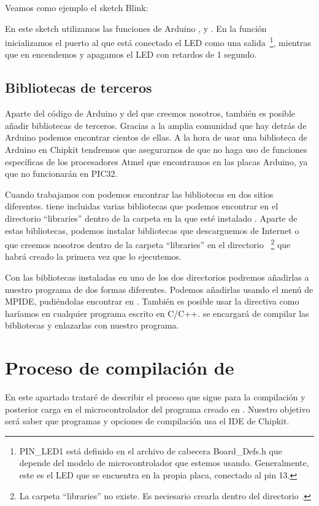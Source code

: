 Veamos como ejemplo el sketch Blink:


En este sketch utilizamos las funciones de Arduino , y . En la función  inicializamos el puerto al que está conectado el LED como una salida~\protect\footnote{PIN\_LED1 está definido en el archivo de cabecera Board\_Defs.h que depende del modelo de microcontrolador que estemos usando. Generalmente, este es el LED que se encuentra en la propia placa, conectado al pin 13.}, mientras que en  encendemos y apagamos el LED con retardos de 1 segundo.

\subsection{Bibliotecas de terceros}
Aparte del código de Arduino y del que creemos nosotros, también es posible añadir bibliotecas de terceros. Gracias a la amplia comunidad que hay detrás de Arduino podemos encontrar cientos de ellas. A la hora de usar una biblioteca de Arduino en Chipkit tendremos que asegurarnos de que no haga uso de funciones específicas de los procesadores Atmel que encontramos en las placas Arduino, ya que no funcionarán en PIC32.

Cuando trabajamos con  podemos encontrar las bibliotecas en dos sitios diferentes.  tiene incluidas varias bibliotecas que podemos encontrar en el directorio ``libraries'' dentro de la carpeta en la que esté instalado . Aparte de estas bibliotecas, podemos instalar bibliotecas que descarguemos de Internet o que creemos nosotros dentro de la carpeta ``libraries'' en el directorio ~\protect\footnote{La carpeta ``libraries'' no existe. Es neciesario crearla dentro del directorio .} que  habrá creado la primera vez que lo ejecutemos.

Con las bibliotecas instaladas en uno de los dos directorios podremos añadirlas a nuestro programa de dos formas diferentes. Podemos añadirlas usando el menú de MPIDE, pudiéndolas encontrar en . También es posible usar la directiva  como haríamos en cualquier programa escrito en C/C++.  se encargará de compilar las bibliotecas y enlazarlas con nuestro programa.

\section{Proceso de compilación de }
En este apartado trataré de describir el proceso que sigue  para la compilación y posterior carga en el microcontrolador del programa creado en . Nuestro objetivo será saber que programas y opciones de compilación usa el IDE de Chipkit.

